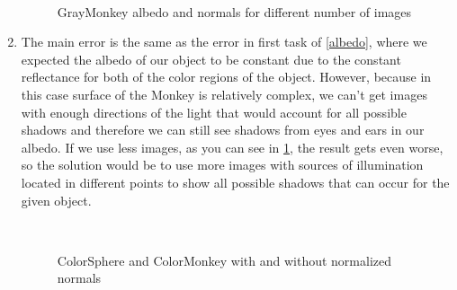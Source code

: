\documentclass{article}
\begin{document}
\begin{enumerate}
    \begin{figure}[h]
        \centering
        \\
        \caption{GrayMonkey albedo and normals for different number of images}
        \label{fig:graymonkey_30vsall}
    \end{figure}
    
    \item The main error is the same as the error in first task of \cref{albedo}, where we expected the albedo of our object to be constant due to the constant reflectance for both of the color regions of the object. However, because in this case surface of the Monkey is relatively complex, we can't get images with enough directions of the light that would account for all possible shadows and therefore we can still see shadows from eyes and ears in our albedo. If we use less images, as you can see in \cref{fig:graymonkey_30vsall}, the result gets even worse, so the solution would be to use more images with sources of illumination located in different points to show all possible shadows that can occur for the given object.
    
    \begin{figure}[h]
        \centering
        \qquad
        \\
        \qquad
        \caption{ColorSphere and ColorMonkey with and without normalized normals}
        \label{color_photometry}
    \end{figure}
    

\end{enumerate}
\end{document}
